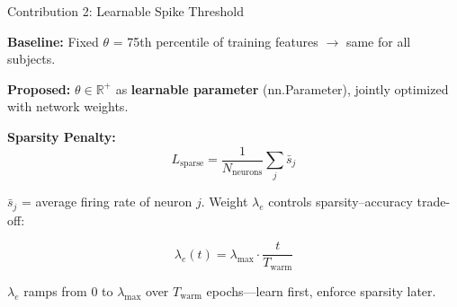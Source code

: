 \documentclass[10pt]{beamer}
\begin{document}
\begin{frame}{Contribution 2: Learnable Spike Threshold}

\footnotesize
\textbf{Baseline:} Fixed $\theta$ = 75th percentile of training features $\to$ same for all subjects.

\vspace{2pt}
\textbf{Proposed:} $\theta \in \mathbb{R}^+$ as \textbf{learnable parameter} (nn.Parameter), jointly optimized with network weights.

\vspace{2pt}
\textbf{Sparsity Penalty:}
\vspace{-2pt}
\begin{equation}
L_{\text{sparse}} = \frac{1}{N_{\text{neurons}}} \sum_j \bar{s}_j
\tag{Eq.~15--17}
\end{equation}

\vspace{-4pt}
$\bar{s}_j$ = average firing rate of neuron $j$. Weight $\lambda_e$ controls sparsity--accuracy trade-off:

\vspace{-2pt}
\begin{equation}
\lambda_e(t) = \lambda_{\max} \cdot \frac{t}{T_{\text{warm}}}
\tag{Warm-up}
\end{equation}

\vspace{-4pt}
$\lambda_e$ ramps from 0 to $\lambda_{\max}$ over $T_{\text{warm}}$ epochs---learn first, enforce sparsity later.

\end{frame}
\end{document}
